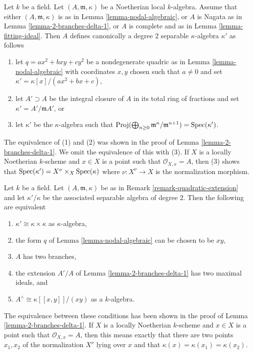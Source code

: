 \begin{remark}
\label{remark-quadratic-extension}
Let $k$ be a field. Let $(A, \mathfrak m, \kappa)$ be a
Noetherian local $k$-algebra. Assume that either
$(A, \mathfrak m, \kappa)$ is as in Lemma \ref{lemma-nodal-algebraic}, or
$A$ is Nagata as in Lemma \ref{lemma-2-branches-delta-1}, or
$A$ is complete and as in Lemma \ref{lemma-fitting-ideal}.
Then $A$ defines canonically a degree $2$ separable $\kappa$-algebra
$\kappa'$ as follows
\begin{enumerate}
\item let $q = ax^2 + bxy + cy^2$ be a nondegenerate quadric
as in Lemma \ref{lemma-nodal-algebraic} with coordinates $x, y$ chosen
such that $a \not = 0$ and set
$\kappa' = \kappa[x]/(ax^2 + bx + c)$,
\item let $A' \supset A$ be the integral closure of $A$ in its
total ring of fractions and set $\kappa' = A'/\mathfrak m A'$, or
\item let $\kappa'$ be the $\kappa$-algebra such that
$\text{Proj}(\bigoplus_{n \geq 0} \mathfrak m^n/\mathfrak m^{n + 1}) =
\mathop{\mathrm{Spec}}(\kappa')$.
\end{enumerate}
The equivalence of (1) and (2) was shown in the proof of
Lemma \ref{lemma-2-branches-delta-1}. We omit the equivalence of
this with (3). If $X$ is a locally Noetherian $k$-scheme and $x \in X$
is a point such that $\mathcal{O}_{X, x} = A$, then (3) shows that
$\mathop{\mathrm{Spec}}(\kappa') = X^\nu \times_X \mathop{\mathrm{Spec}}(\kappa)$ where $\nu : X^\nu \to X$
is the normalization morphism.
\end{remark}

\begin{remark}
\label{remark-trivial-quadratic-extension}
Let $k$ be a field. Let $(A, \mathfrak m, \kappa)$ be as in
Remark \ref{remark-quadratic-extension} and let $\kappa'/\kappa$
be the associated separable algebra of degree $2$.
Then the following are equivalent
\begin{enumerate}
\item $\kappa' \cong \kappa \times \kappa$ as $\kappa$-algebra,
\item the form $q$ of Lemma \ref{lemma-nodal-algebraic}
can be chosen to be $xy$,
\item $A$ has two branches,
\item the extension $A'/A$ of Lemma \ref{lemma-2-branches-delta-1}
has two maximal ideals, and
\item $A^\wedge \cong \kappa[[x, y]]/(xy)$ as a $k$-algebra.
\end{enumerate}
The equivalence between these conditions has been shown in the
proof of Lemma \ref{lemma-2-branches-delta-1}. If $X$ is a
locally Noetherian $k$-scheme and $x \in X$ is a point such that
$\mathcal{O}_{X, x} = A$, then this means exactly that
there are two points $x_1, x_2$ of the normalization $X^\nu$
lying over $x$ and that $\kappa(x) = \kappa(x_1) = \kappa(x_2)$.
\end{remark}


